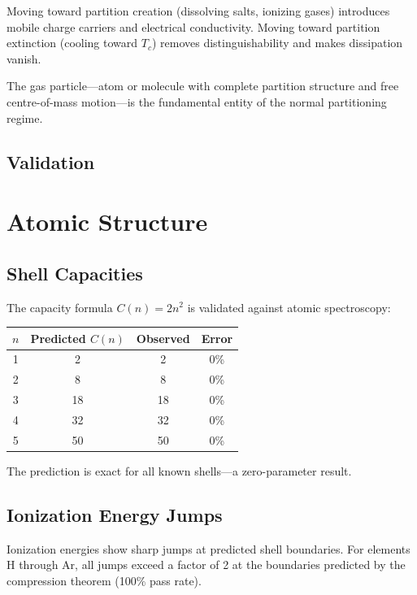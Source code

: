 Moving toward partition creation (dissolving salts, ionizing gases) introduces mobile charge carriers and electrical conductivity. Moving toward partition extinction (cooling toward $T_c$) removes distinguishability and makes dissipation vanish.

The gas particle---atom or molecule with complete partition structure and free centre-of-mass motion---is the fundamental entity of the normal partitioning regime.


\subsection{Validation}
\label{part:validation}

\section{Atomic Structure}
\label{sec:val_atomic}

\subsection{Shell Capacities}

The capacity formula $C(n) = 2n^2$ is validated against atomic spectroscopy:

\begin{center}
\begin{tabular}{cccc}
\toprule
$n$ & Predicted $C(n)$ & Observed & Error \\
\midrule
1 & 2 & 2 & 0\% \\
2 & 8 & 8 & 0\% \\
3 & 18 & 18 & 0\% \\
4 & 32 & 32 & 0\% \\
5 & 50 & 50 & 0\% \\
\bottomrule
\end{tabular}
\end{center}

The prediction is exact for all known shells---a zero-parameter result.

\subsection{Ionization Energy Jumps}

Ionization energies show sharp jumps at predicted shell boundaries. For elements H through Ar, all jumps exceed a factor of 2 at the boundaries predicted by the compression theorem (100\% pass rate).

